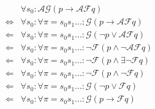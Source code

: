 
\begin{align*}
& \forall s_0:\mathcal{AG}(p\rightarrow\mathcal{AF}q) \\
\Leftrightarrow & \forall s_0:\forall\pi=s_0s_1...;\mathcal{G}(p\rightarrow\mathcal{AF}q) \\
\Leftarrow & \forall s_0:\forall\pi=s_0s_1...:\mathcal{G}(\neg p\vee\mathcal{AF}q) \\
\Leftarrow & \forall s_0:\forall\pi=s_0s_1...:\neg\mathcal{F}(p\wedge\neg\mathcal{AF}q) \\
\Leftarrow & \forall s_0:\forall\pi=s_0s_1...:\neg\mathcal{F}(p\wedge\exists\neg\mathcal{F}q) \\
\Leftarrow & \forall s_0:\forall\pi=s_0s_1...:\neg\mathcal{F}(p\wedge\neg\mathcal{F}q) \\
\Leftarrow & \forall s_0:\forall\pi=s_0s_1...:\mathcal{G}(\neg p\vee\mathcal{F}q) \\
\Leftarrow & \forall s_0:\forall\pi=s_0s_1...:\mathcal{G}(p\rightarrow\mathcal{F}q)
\end{align*}